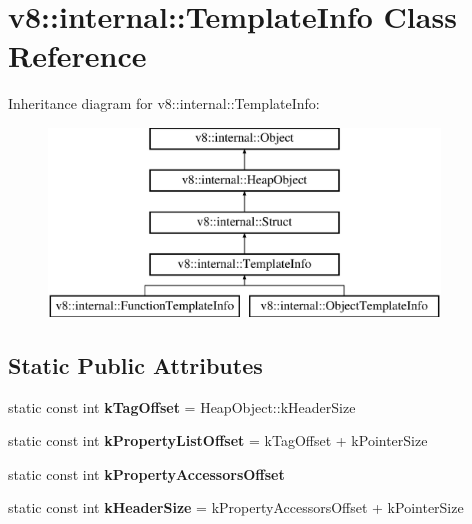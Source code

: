 \hypertarget{classv8_1_1internal_1_1_template_info}{}\section{v8\+:\+:internal\+:\+:Template\+Info Class Reference}
\label{classv8_1_1internal_1_1_template_info}
Inheritance diagram for v8\+:\+:internal\+:\+:Template\+Info\+:\begin{figure}[H]
\begin{center}
\leavevmode
\includegraphics[height=5.000000cm]{classv8_1_1internal_1_1_template_info}
\end{center}
\end{figure}
\subsection*{Static Public Attributes}
\begin{DoxyCompactItemize}
\item 
\hypertarget{classv8_1_1internal_1_1_template_info_a707d7c2573422152cb616cfcd5e615c5}{}static const int {\bfseries k\+Tag\+Offset} = Heap\+Object\+::k\+Header\+Size\label{classv8_1_1internal_1_1_template_info_a707d7c2573422152cb616cfcd5e615c5}

\item 
\hypertarget{classv8_1_1internal_1_1_template_info_aa81d841263b8c40644c86dbaccccf6b1}{}static const int {\bfseries k\+Property\+List\+Offset} = k\+Tag\+Offset + k\+Pointer\+Size\label{classv8_1_1internal_1_1_template_info_aa81d841263b8c40644c86dbaccccf6b1}

\item 
static const int {\bfseries k\+Property\+Accessors\+Offset}
\item 
\hypertarget{classv8_1_1internal_1_1_template_info_adab3309b0eba2ec032212844897b3c00}{}static const int {\bfseries k\+Header\+Size} = k\+Property\+Accessors\+Offset + k\+Pointer\+Size\label{classv8_1_1internal_1_1_template_info_adab3309b0eba2ec032212844897b3c00}

\end{DoxyCompactItemize}
